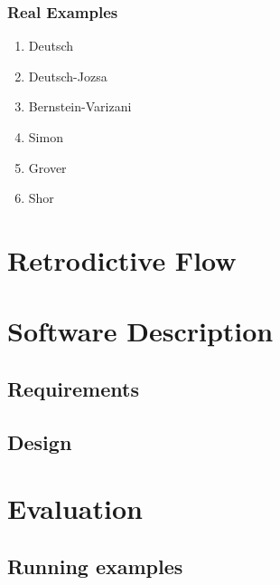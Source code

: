 \documentclass{beamer}
\newcommand{\red}[1]{{\color{red}{#1}}}
\begin{document}

\begin{frame}

\frametitle{Real Examples}

\begin{enumerate}
  \item Deutsch
  \item Deutsch-Jozsa
  \item Bernstein-Varizani
  \item Simon
  \item Grover
  \item Shor
\end{enumerate}

\pause

\vspace*{1cm}
\red{caveat: Black-Box vs White Box}

\end{frame}


\section[Retrodictive]{Retrodictive Flow}



\section[Software]{Software Description}
\subsection[Requirements]{Requirements}
\subsection[Design]{Design}


\section[Evaluation]{Evaluation}
\subsection[Running]{Running examples}
\end{document}
